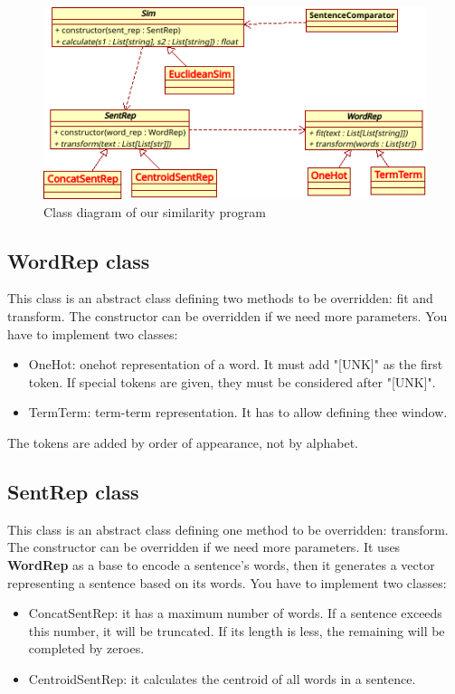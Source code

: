 \documentclass[11pt, a4paper]{article}
\begin{document}
\begin{figure}[htp!]
	\centering
	\includegraphics{./lab03.png}
	\caption{Class diagram of our similarity program}
	\label{fig:program}
\end{figure}

\subsection{WordRep class}

This class is an abstract class defining two methods to be overridden: fit and transform.
The constructor can be overridden if we need more parameters.
You have to implement two classes:
\begin{itemize}
	\item OneHot: onehot representation of a word. It must add "[UNK]" as the first token.
	If special tokens are given, they must be considered after "[UNK]".
	\item TermTerm: term-term representation. It has to allow defining thee window.
\end{itemize}

The tokens are added by order of appearance, not by alphabet.

\subsection{SentRep class}

This class is an abstract class defining one method to be overridden: transform.
The constructor can be overridden if we need more parameters.
It uses \textbf{WordRep} as a base to encode a sentence's words, then it generates a vector representing a sentence based on its words.
You have to implement two classes:
\begin{itemize}
	\item ConcatSentRep: it has a maximum number of words. If a sentence exceeds this number, it will be truncated.
	If its length is less, the remaining will be completed by zeroes.
	\item CentroidSentRep: it calculates the centroid of all words in a sentence.
\end{itemize}
\end{document}
